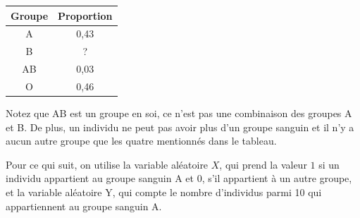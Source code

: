 \begin{questions}
\begin{table}[h]
    \centering
\begin{tabular}{|c|c|}
\hline
    Groupe & Proportion\\
    \hline
     A&  0,43\\
     B& ?\\
     AB& 0,03 \\
     O& 0,46\\
     \hline
\end{tabular}
    \label{tab:my_label}
\end{table}

Notez que AB est un groupe en soi, ce n'est pas une combinaison des groupes A et B. De plus, un individu ne peut pas avoir plus d'un groupe sanguin et il n'y a aucun autre groupe que les quatre mentionnés dans le tableau.


Pour ce qui suit, on utilise la variable aléatoire $X$, qui prend la valeur $1$ si un individu appartient au groupe sanguin A et $0$, s'il appartient à un autre groupe, et la variable aléatoire Y, qui compte le nombre d'individus parmi 10 qui appartiennent au groupe sanguin A.


\end{questions}

